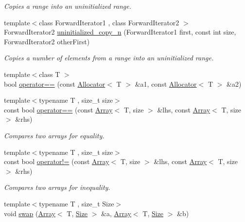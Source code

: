 \begin{DoxyCompactItemize}
\begin{DoxyCompactList}\small\item\em Copies a range into an uninitialized range. \end{DoxyCompactList}\item 
{\footnotesize template$<$class Forward\+Iterator1 , class Forward\+Iterator2 $>$ }\\Forward\+Iterator2 \hyperlink{namespaceprism_ad1c7d8eb38174ba66d98321b68047e6e}{uninitialized\+\_\+copy\+\_\+n} (Forward\+Iterator1 first, const int size, Forward\+Iterator2 other\+First)
\begin{DoxyCompactList}\small\item\em Copies a number of elements from a range into an uninitialized range. \end{DoxyCompactList}\item 
{\footnotesize template$<$class T $>$ }\\bool \hyperlink{namespaceprism_a1faf99d35e2cbb2b8c0644aa0b777e9b}{operator==} (const \hyperlink{classprism_1_1_allocator}{Allocator}$<$ T $>$ \&a1, const \hyperlink{classprism_1_1_allocator}{Allocator}$<$ T $>$ \&a2)
\item 
{\footnotesize template$<$typename T , size\+\_\+t size$>$ }\\const bool \hyperlink{namespaceprism_a23cc68e19002deb7797ff9eaa10523db}{operator==} (const \hyperlink{classprism_1_1_array}{Array}$<$ T, size $>$ \&lhs, const \hyperlink{classprism_1_1_array}{Array}$<$ T, size $>$ \&rhs)
\begin{DoxyCompactList}\small\item\em Compares two arrays for equality. \end{DoxyCompactList}\item 
{\footnotesize template$<$typename T , size\+\_\+t size$>$ }\\const bool \hyperlink{namespaceprism_ae176101945a65ff8a61af85fcf832221}{operator!=} (const \hyperlink{classprism_1_1_array}{Array}$<$ T, size $>$ \&lhs, const \hyperlink{classprism_1_1_array}{Array}$<$ T, size $>$ \&rhs)
\begin{DoxyCompactList}\small\item\em Compares two arrays for inequality. \end{DoxyCompactList}\item 
{\footnotesize template$<$typename T , size\+\_\+t Size$>$ }\\void \hyperlink{namespaceprism_aff86329b54a13cb753f2c79156f68bb4}{swap} (\hyperlink{classprism_1_1_array}{Array}$<$ T, \hyperlink{classprism_1_1_size}{Size} $>$ \&a, \hyperlink{classprism_1_1_array}{Array}$<$ T, \hyperlink{classprism_1_1_size}{Size} $>$ \&b)

\end{DoxyCompactItemize}
